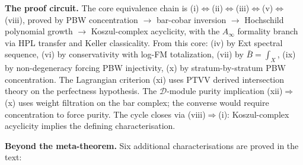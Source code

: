 \documentclass[11pt,reqno]{amsart}
\theoremstyle{definition}
\theoremstyle{remark}
\providecommand{\barB}{\bar{B}}
\numberwithin{equation}{section}
\begin{document}
\medskip
\noindent\textbf{The proof circuit.}\enspace
The core equivalence chain is
(i)$\Leftrightarrow$(ii)$\Leftrightarrow$(iii)$\Leftrightarrow$(v)$\Leftrightarrow$(viii),
proved by PBW concentration $\to$ bar-cobar inversion $\to$ Hochschild
polynomial growth $\to$ Koszul-complex acyclicity, with the $A_\infty$
formality branch via HPL transfer and Keller classicality. From this
core: (iv) by Ext spectral sequence, (vi) by conservativity with
log-FM totalization, (vii) by $\barB=\int_X$, (ix) by non-degeneracy
forcing PBW injectivity, (x) by stratum-by-stratum PBW concentration.
The Lagrangian criterion (xi) uses PTVV derived intersection theory
on the perfectness hypothesis. The $\mathcal D$-module purity
implication (xii)$\Rightarrow$(x) uses weight filtration on the bar
complex; the converse would require concentration to force purity.
The cycle closes via (viii)$\Rightarrow$(i): Koszul-complex acyclicity
implies the defining characterisation.

\medskip
\noindent\textbf{Beyond the meta-theorem.}\enspace
Six additional characterisations are proved in the text:
\end{document}

